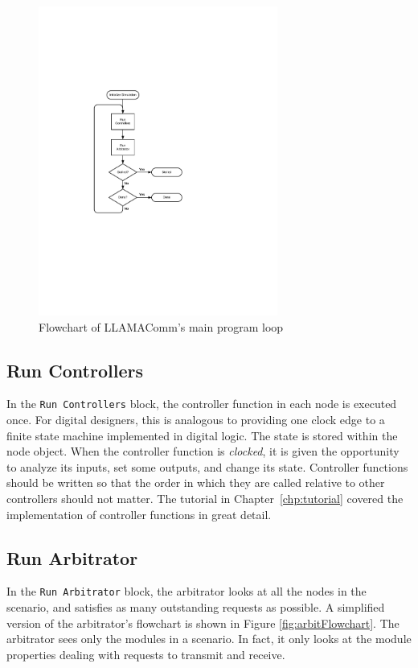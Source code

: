 \begin{figure}[h]
\centering
\includegraphics[height=4in]{figs/Main_Loop_Flowchart}
\caption{Flowchart of LLAMAComm's main program loop}
\label{fig:mainLoop}
\end{figure}

\subsection{Run Controllers}

In the \verb+Run Controllers+ block, the controller function in each
node is executed once.  For digital designers, this is analogous to
providing one clock edge to a finite state machine implemented in
digital logic.  The state is stored within the node object.  When
the controller function is \emph{clocked}, it is given the
opportunity to analyze its inputs, set some outputs, and change its
state. Controller functions should be written so that the order in
which they are called relative to other controllers should not
matter. The tutorial in Chapter~\ref{chp:tutorial} covered the
implementation of controller functions in great detail.

\subsection{Run Arbitrator} \label{sec:runArbitrator}

In the \verb+Run Arbitrator+ block, the arbitrator looks at all the
nodes in the scenario, and satisfies as many outstanding requests as
possible.  A simplified version of the arbitrator's flowchart is
shown in Figure \ref{fig:arbitFlowchart}.  The arbitrator sees only
the modules in a scenario.  In fact, it only looks at the module
properties dealing with requests to transmit and receive.

